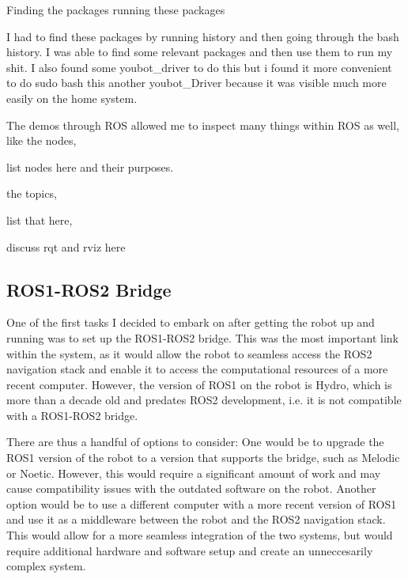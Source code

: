 \documentclass[a4paper, 12pt]{article}
\newif\ifshownotes
\newcommand{\notes}[1]{\ifshownotes\textcolor{blue}{#1}\fi}
\begin{document}
    \notes{describe the process of inspecting the installed software, the drivers and wrappers, and running the original demos.}
     \notes{rqt, rviz, the various topics and nodes, etc. }
    Finding the packages
    running these packages

    I had to find these packages by running history and then going through the bash history. I was able to find some relevant packages and then use them to run my shit. I also found some youbot\_driver to do this but i found it more convenient to do sudo bash this another youbot\_Driver because it was visible much more easily on the home system. 

    The demos through ROS allowed me to inspect many things within ROS as well, like the nodes,

    list nodes here and their purposes.

    the topics,

    list that here,

    discuss rqt and rviz here

    \pagebreak

    \pagebreak
    \subsection{ROS1-ROS2 Bridge}

    One of the first tasks I decided to embark on after getting the robot up and running was to set up the ROS1-ROS2 bridge. This was the most important link within the system, as it would allow the robot to seamless access the ROS2 navigation stack and enable it to access the computational resources of a more recent computer. However, the version of ROS1 on the robot is Hydro, which is more than a decade old and predates ROS2 development, i.e. it is not compatible with a ROS1-ROS2 bridge. 

    There are thus a handful of options to consider: One would be to upgrade the ROS1 version of the robot to a version that supports the bridge, such as Melodic or Noetic. However, this would require a significant amount of work and may cause compatibility issues with the outdated software on the robot. Another option would be to use a different computer with a more recent version of ROS1 and use it as a middleware between the robot and the ROS2 navigation stack. This would allow for a more seamless integration of the two systems, but would require additional hardware and software setup and create an unneccesarily complex system. 
\end{document}
